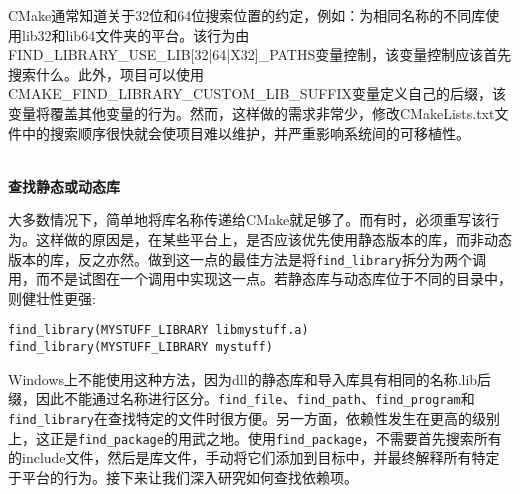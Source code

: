 CMake通常知道关于32位和64位搜索位置的约定，例如：为相同名称的不同库使用lib32和lib64文件夹的平台。该行为由FIND\_LIBRARY\_USE\_LIB[32|64|X32]\_PATHS变量控制，该变量控制应该首先搜索什么。此外，项目可以使用CMAKE\_FIND\_LIBRARY\_CUSTOM\_LIB\_SUFFIX变量定义自己的后缀，该变量将覆盖其他变量的行为。然而，这样做的需求非常少，修改CMakeLists.txt文件中的搜索顺序很快就会使项目难以维护，并严重影响系统间的可移植性。

\hspace*{\fill} \\ %
\noindent
\textbf{查找静态或动态库}

大多数情况下，简单地将库名称传递给CMake就足够了。而有时，必须重写该行为。这样做的原因是，在某些平台上，是否应该优先使用静态版本的库，而非动态版本的库，反之亦然。做到这一点的最佳方法是将\texttt{find\_library}拆分为两个调用，而不是试图在一个调用中实现这一点。若静态库与动态库位于不同的目录中，则健壮性更强:

\begin{lstlisting}[style=styleCMake]
find_library(MYSTUFF_LIBRARY libmystuff.a)
find_library(MYSTUFF_LIBRARY mystuff)
\end{lstlisting}

Windows上不能使用这种方法，因为dll的静态库和导入库具有相同的名称.lib后缀，因此不能通过名称进行区分。\texttt{find\_file}、\texttt{find\_path}、\texttt{find\_program}和\texttt{find\_library}在查找特定的文件时很方便。另一方面，依赖性发生在更高的级别上，这正是\texttt{find\_package}的用武之地。使用\texttt{find\_package}，不需要首先搜索所有的include文件，然后是库文件，手动将它们添加到目标中，并最终解释所有特定于平台的行为。接下来让我们深入研究如何查找依赖项。



